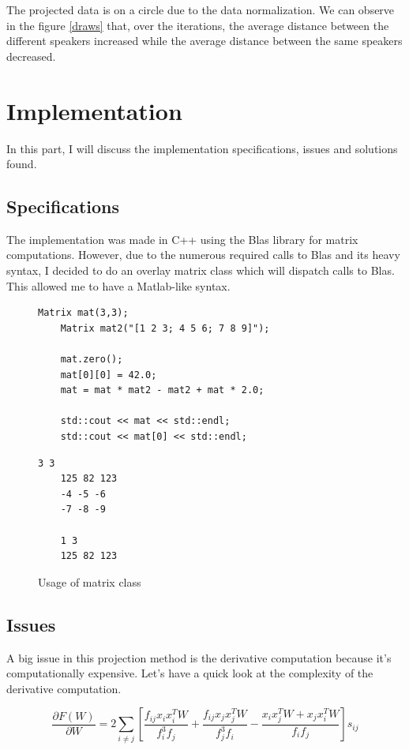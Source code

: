 \documentclass{techrep}
\begin{document}
The projected data is on a circle due to the data normalization.  We can
observe in the figure \ref{draws} that, over the iterations, the
average distance between the different speakers increased while the
average distance between the same speakers decreased.

\section{Implementation}
In this part, I will discuss the implementation specifications, issues
and solutions found.

\subsection{Specifications}

The implementation was made in C++ using the Blas library for matrix
computations.  However, due to the numerous required calls to Blas and
its heavy syntax, I decided to do an overlay matrix class which will
dispatch calls to Blas. This allowed me to have a Matlab-like syntax.

\lstset{language=c++}
\begin{figure}[H]
  \begin{lstlisting}[frame=single, caption=Source]
    Matrix mat(3,3);
    Matrix mat2("[1 2 3; 4 5 6; 7 8 9]");

    mat.zero();
    mat[0][0] = 42.0;
    mat = mat * mat2 - mat2 + mat * 2.0;

    std::cout << mat << std::endl;
    std::cout << mat[0] << std::endl;
  \end{lstlisting}

  \begin{lstlisting}[frame=single, caption=Output]
    3 3
    125 82 123
    -4 -5 -6
    -7 -8 -9

    1 3
    125 82 123
  \end{lstlisting}
  \caption{Usage of matrix class}
  \label{algo_matrix}
\end{figure}

\subsection{Issues}

A big issue in this projection method is the derivative computation
because it's computationally expensive.
Let's have a quick look at the complexity of the derivative computation.

$$\frac{\partial{F(W)}}{\partial{W}} =
2\sum_{i\neq{}j}\left[\frac{f_{ij}x_ix_i^TW}{f_i^3f_j} +
  \frac{f_{ij}x_jx_j^TW}{f_j^3f_i} - \frac{x_ix_j^TW + x_jx_i^TW}{f_if_j}\right]s_{ij}$$
\end{document}
